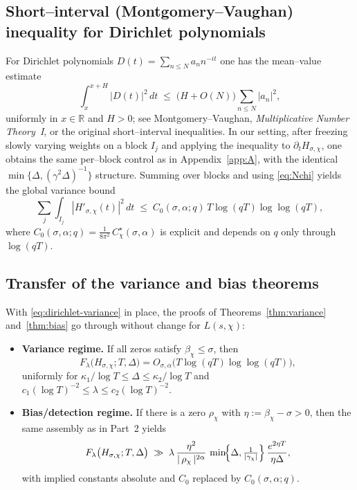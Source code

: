 \subsection*{Short–interval (Montgomery–Vaughan) inequality for Dirichlet polynomials}
For Dirichlet polynomials $D(t)=\sum_{n\le N} a_n n^{-it}$ one has the mean–value
estimate
\[
\int_{x}^{x+H}\!\!\bigl|D(t)\bigr|^2\,dt
\;\le\;
\bigl(H + O(N)\bigr)\sum_{n\le N}|a_n|^2,
\]
uniformly in $x\in\mathbb{R}$ and $H>0$; see Montgomery–Vaughan, \emph{Multiplicative Number Theory~I}, or
the original short–interval inequalities. In our setting, after freezing slowly varying
weights on a block $I_j$ and applying the inequality to $\partial_t H_{\sigma,\chi}$,
one obtains the same per–block control as in Appendix~\ref{app:A}, with the identical
$\min\{\Delta,(\gamma^2 \Delta)^{-1}\}$ structure. Summing over blocks and using
\eqref{eq:Nchi} yields the global variance bound
\begin{equation}
\sum_j \int_{I_j}\!|H'_{\sigma,\chi}(t)|^2\,dt
\;\le\;
C_0(\sigma,\alpha;q)\,T\log(qT)\log\log(qT),
\label{eq:dirichlet-variance}
\end{equation}
where $C_0(\sigma,\alpha;q)=\frac{1}{8\pi^2}\,C^\star_\chi(\sigma,\alpha)$ is explicit and
depends on $q$ only through $\log(qT)$.

\subsection*{Transfer of the variance and bias theorems}
With \eqref{eq:dirichlet-variance} in place, the proofs of Theorems~\ref{thm:variance}
and~\ref{thm:bias} go through without change for $L(s,\chi)$:
\begin{itemize}
\item \textbf{Variance regime.} If all zeros satisfy $\beta_\chi\le \sigma$, then
\[
F_\lambda\bigl(H_{\sigma,\chi};T,\Delta\bigr)
=O_{\sigma,\alpha}\!\bigl(T\log(qT)\log\log(qT)\bigr),
\]
uniformly for $\kappa_1/\log T\le \Delta\le \kappa_2/\log T$ and
$c_1(\log T)^{-2}\le \lambda\le c_2(\log T)^{-2}$.
\item \textbf{Bias/detection regime.} If there is a zero $\rho_\chi$ with
$\eta:=\beta_\chi-\sigma>0$, then the same assembly as in Part~2 yields
\[
F_\lambda\bigl(H_{\sigma,\chi};T,\Delta\bigr)
\;\gg\;
\lambda\,
\frac{\eta^{2}}{|\,\rho_\chi\,|^{2\alpha}}\,
\min\!\Bigl\{\Delta,\tfrac{1}{|\gamma_\chi|}\Bigr\}\,
\frac{e^{2\eta T}}{\eta\Delta},
\]
with implied constants absolute and $C_0$ replaced by $C_0(\sigma,\alpha;q)$.
\end{itemize}

